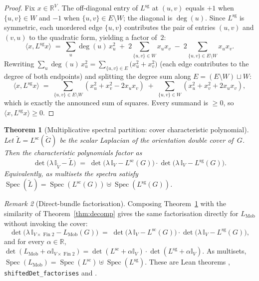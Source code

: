 \documentclass[11pt,a4paper]{amsart}
\theoremstyle{plain}
\newtheorem{theorem}{Theorem}[section]
\theoremstyle{definition}
\theoremstyle{remark}
\newtheorem{remark}[theorem]{Remark}
\newcommand{\RR}{\mathbb{R}}
\newcommand{\II}{\mathbb{I}}
\newcommand{\tG}{\widetilde{G}}
\newcommand{\tV}{\widetilde{V}}
\newcommand{\tL}{\widetilde{L}}
\newcommand{\Lscalar}{L^{\operatorname{sc}}}
\newcommand{\Lsigned}{L^{\operatorname{sg}}}
\newcommand{\pair}[2]{\langle #1, #2 \rangle}
\begin{document}
\begin{proof}
Fix $x\in\RR^V$. The off-diagonal entry of $\Lsigned$ at $(u,v)$
equals $+1$ when $\{u,v\}\in W$ and $-1$ when $\{u,v\}\in E\setminus W$;
the diagonal is $\deg(u)$. Since $\Lsigned$ is symmetric, each
unordered edge $\{u,v\}$ contributes the pair of entries $(u,v)$
and $(v,u)$ to the quadratic form, yielding a factor of~$2$:
\[
  \pair{x}{\Lsigned x}
  \;=\; \sum_u \deg(u)\,x_u^2
      \;+\; 2\!\!\sum_{\{u,v\}\in W}\!\!x_u x_v
      \;-\; 2\!\!\sum_{\{u,v\}\in E\setminus W}\!\!x_u x_v.
\]
Rewriting $\sum_u \deg(u)\,x_u^2
= \sum_{\{u,v\}\in E}\bigl(x_u^2 + x_v^2\bigr)$ (each edge
contributes to the degree of both endpoints) and splitting the
degree sum along $E = (E\setminus W)\sqcup W$:
\[
  \pair{x}{\Lsigned x}
  \;=\;\!\!\sum_{\{u,v\}\in E\setminus W}\!\!(x_u^2 + x_v^2 - 2 x_u x_v)
    \;+\;\sum_{\{u,v\}\in W}(x_u^2 + x_v^2 + 2 x_u x_v),
\]
which is exactly the announced sum of squares. Every summand is
$\ge 0$, so $\pair{x}{\Lsigned x}\ge 0$.
\end{proof}

\begin{theorem}[Multiplicative spectral partition: cover
characteristic polynomial]\label{thm:cover-charpoly}
Let $\tL = \Lscalar(\tG)$ be the scalar Laplacian of the orientation
double cover of~$G$. Then the characteristic polynomials factor as
\[
  \det\bigl(\lambda\,\II_{\tV} - \tL\bigr) \;=\;
  \det\bigl(\lambda\,\II_V - \Lscalar(G)\bigr)\cdot
  \det\bigl(\lambda\,\II_V - \Lsigned(G)\bigr).
\]
Equivalently, as multisets the spectra satisfy
$\operatorname{Spec}(\tL) = \operatorname{Spec}(\Lscalar(G)) \uplus
\operatorname{Spec}(\Lsigned(G))$.
\end{theorem}

\begin{remark}[Direct-bundle factorisation]\label{rem:direct-bundle-charpoly}
Composing Theorem~\ref{thm:cover-charpoly} with the similarity of
Theorem~\ref{thm:decomp} gives the same factorisation directly for
$L_{\mathrm{Mob}}$ without invoking the cover:
\[
  \det\bigl(\lambda\,\II_{V\times\operatorname{Fin}2} - L_{\mathrm{Mob}}(G)\bigr)
  \;=\;
  \det\bigl(\lambda\,\II_V - \Lscalar(G)\bigr)\cdot
  \det\bigl(\lambda\,\II_V - \Lsigned(G)\bigr),
\]
and for every $\alpha\in\RR$,
$\det(L_{\mathrm{Mob}}+\alpha\II_{V\times\operatorname{Fin}2})
=\det(\Lscalar+\alpha\II_V)\cdot
\det(\Lsigned+\alpha\II_V)$. As multisets,
$\operatorname{Spec}(L_{\mathrm{Mob}}) = \operatorname{Spec}(\Lscalar)
\uplus \operatorname{Spec}(\Lsigned)$. These are Lean theorems
,
\texttt{shiftedDet\_factorises} and
.
\end{remark}
\end{document}
